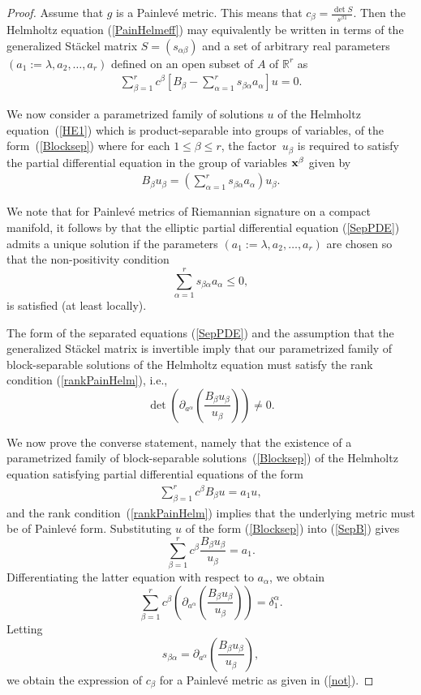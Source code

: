 \documentclass[pdftex]{sigma}
\numberwithin{equation}{section}
\begin{document}
\begin{proof}
Assume that $g$ is a Painlev\'e metric. This means that $c_\beta = \frac{\det S}{s^{\beta 1}}$. Then the Helmholtz equation (\ref{PainHelmeff}) may equivalently be written in terms of the generalized St\"ackel matrix $S = (s_{\alpha \beta})$ and a set of arbitrary real parameters $(a_{1}:=\lambda, a_{2},\dots, a_{r})$ defined on an open subset of $A$ of ${\mathbb R}^{r}$ as
\begin{gather} \label{HE1}
\sum_{\beta =1}^{r} c^{\beta} \left[B_{\beta} -\sum_{\alpha =1}^{r}s_{\beta \alpha}a_{\alpha}\right] u = 0.
\end{gather}

We now consider a parametrized family of solutions $u$ of the Helmholtz equation~(\ref{HE1}) which is product-separable into groups of variables, of the form~(\ref{Blocksep}) where for each $1\leq \beta \leq r$, the factor~$u_{\beta}$ is required to satisfy the partial differential equation in the group of variables ${\bf x}^{\beta}$ given by
\begin{gather}\label{SepPDE}
 B_{\beta}u_{\beta} = \left(\sum_{\alpha =1}^{r}s_{\beta \alpha} a_{\alpha}\right) u_\beta.
\end{gather}

We note that for Painlev\'e metrics of Riemannian signature on a compact manifold, it follows by \cite[Theorem~8.3]{GiTru2001} that the elliptic partial differential equation (\ref{SepPDE}) admits a unique solution if the parameters $(a_{1}:=\lambda, a_{2},\dots, a_{r})$ are chosen so that the non-positivity condition
\[
\sum_{\alpha =1}^{r}s_{\beta \alpha} a_{\alpha}\leq 0,
\]
is satisfied (at least locally).

The form of the separated equations (\ref{SepPDE}) and the assumption that the generalized St\"ackel matrix is invertible imply that our parametrized family of block-separable solutions of the Helmholtz equation must satisfy the rank condition (\ref{rankPainHelm}),  i.e.,
\[
\det \left({\partial_{a^{\alpha}}\left(\frac{B_{\beta} u_{\beta}}{u_{\beta}}\right)}\right)\neq 0.
\]

We now prove the converse statement, namely that the existence of a parametrized family of block-separable solutions~(\ref{Blocksep}) of the Helmholtz equation satisfying partial differential equations of the form
\begin{gather}\label{SepB}
\sum_{\beta =1}^{r}c^{\beta}B_{\beta} u=a_{1}u,
\end{gather}
and the rank condition~(\ref{rankPainHelm}) implies that the underlying metric must be of Painlev\'e form. Substituting $u$ of the form (\ref{Blocksep}) into (\ref{SepB}) gives
\[
\sum_{\beta =1}^{r} c^{\beta}\frac{B_{\beta} u_{\beta}}{u_{\beta}}=a_{1}.
\]
Differentiating the latter equation with respect to $a_{\alpha}$, we obtain
\[
\sum_{\beta =1}^{r} c^{\beta}\left({\partial_{a^{\alpha}}\left(\frac{B_{\beta} u_{\beta}}{u_{\beta}}\right)}\right)=\delta^{\alpha}_{1}.
\]
Letting
\[
s_{\beta \alpha}={\partial_{a^{\alpha}}\left(\frac{B_{\beta} u_{\beta}}{u_{\beta}}\right)},
\]
we obtain the expression of $c_{\beta}$ for a Painlev\'e metric as given in (\ref{not}).
\end{proof}
\end{document}
